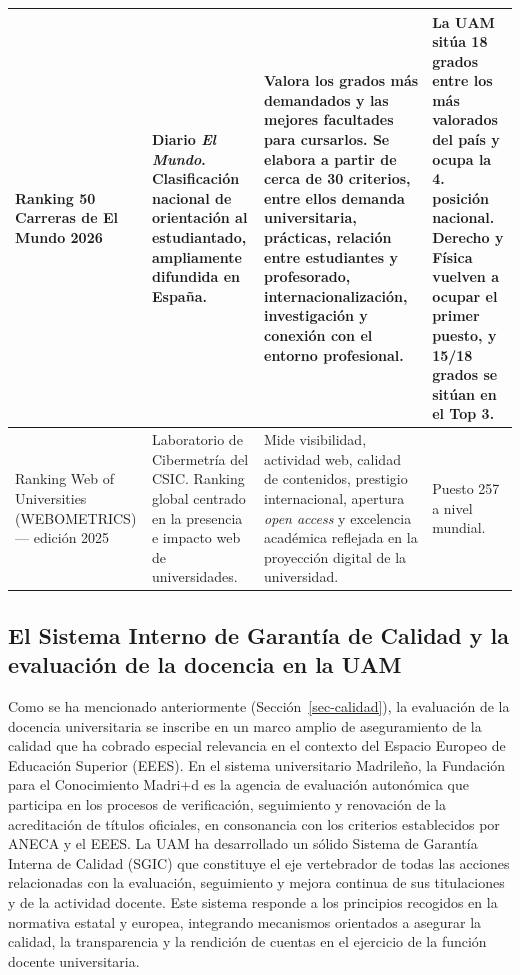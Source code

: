 \documentclass[
  11pt,
  a4paper,
  twoside]{scrreprt}
\begin{document}
\begin{landscape}
\begin{longtable}{p{3cm} p{5cm} p{8cm} p{6cm}}
Ranking 50 Carreras de El Mundo 2026
&
Diario \textit{El Mundo}. Clasificación nacional de orientación al estudiantado, ampliamente difundida en España. 
&
Valora los grados más demandados y las mejores facultades para cursarlos. Se elabora a partir de cerca de 30 criterios, entre ellos demanda universitaria, prácticas, relación entre estudiantes y profesorado, internacionalización, investigación y conexión con el entorno profesional.
&
La UAM sitúa 18 grados entre los más valorados del país y ocupa la 4.\textordfeminine{} posición nacional. Derecho y Física vuelven a ocupar el primer puesto, y 15/18 grados se sitúan en el Top 3.
\\
\hline

Ranking Web of Universities (WEBOMETRICS) --- edición 2025
&
Laboratorio de Cibermetría del CSIC. Ranking global centrado en la presencia e impacto web de universidades.
&
Mide visibilidad, actividad web, calidad de contenidos, prestigio internacional, apertura \textit{open access} y excelencia académica reflejada en la proyección digital de la universidad.
&
Puesto 257 a nivel mundial.
\\
\hline

\end{longtable}

\end{landscape}

\subsection{El Sistema Interno de Garantía de Calidad y la evaluación de
la docencia en la UAM}\label{sec-sigc}

Como se ha mencionado anteriormente (Sección~\ref{sec-calidad}), la
evaluación de la docencia universitaria se inscribe en un marco amplio
de aseguramiento de la calidad que ha cobrado especial relevancia en el
contexto del Espacio Europeo de Educación Superior (EEES). En el sistema
universitario Madrileño, la Fundación para el Conocimiento Madri+d es la
agencia de evaluación autonómica que participa en los procesos de
verificación, seguimiento y renovación de la acreditación de títulos
oficiales, en consonancia con los criterios establecidos por ANECA y el
EEES. La UAM ha desarrollado un sólido Sistema de Garantía Interna de
Calidad (SGIC) que constituye el eje vertebrador de todas las acciones
relacionadas con la evaluación, seguimiento y mejora continua de sus
titulaciones y de la actividad docente. Este sistema responde a los
principios recogidos en la normativa estatal y europea, integrando
mecanismos orientados a asegurar la calidad, la transparencia y la
rendición de cuentas en el ejercicio de la función docente
universitaria.
\end{document}
